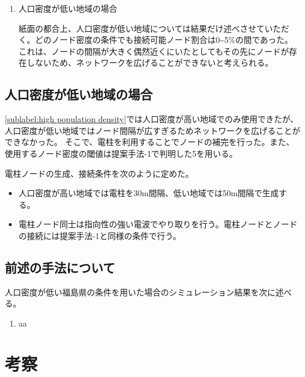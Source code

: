 \documentclass[a4paper, 9pt]{ltjsarticle}
\begin{document}
\begin{enumerate}
  \item 人口密度が低い地域の場合 \par
  \indent 紙面の都合上、人口密度が低い地域については結果だけ述べさせていただく。どのノード密度の条件でも接続可能ノード割合は0\textasciitilde5\%の間であった。
  これは、ノードの間隔が大きく偶然近くにいたとしてもその先にノードが存在しないため、ネットワークを広げることができないと考えられる。
\end{enumerate}

\subsection{人口密度が低い地域の場合} \label{sublabel:low population density}
\ref{sublabel:high population density}では人口密度が高い地域でのみ使用できたが、人口密度が低い地域ではノード間隔が広すぎるためネットワークを広げることができなかった。
そこで、電柱を利用することでノードの補完を行った。また、使用するノード密度の閾値は提案手法-1で判明した5を用いる。\par
電柱ノードの生成、接続条件を次のように定めた。

\begin{itemize}
  \item 人口密度が高い地域では電柱を30m間隔、低い地域では50m間隔で生成する。
  \item 電柱ノード同士は指向性の強い電波でやり取りを行う。電柱ノードとノードの接続には提案手法-1と同様の条件で行う。
\end{itemize}

\subsection{前述の手法について} \label{sublabel:low population density methods}
人口密度が低い福島県の条件を用いた場合のシミュレーション結果を次に述べる。

\begin{enumerate}
  \item aa
\end{enumerate}

\section{考察} \label{label:consideration}
\end{document}
